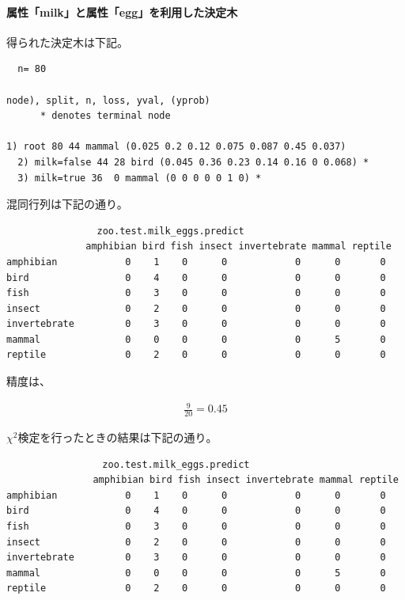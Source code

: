 \documentclass[dvipdfmx]{jsarticle}
\begin{document}
\paragraph{属性「milk」と属性「egg」を利用した決定木}\par
得られた決定木は下記。
\begin{verbatim}
  n= 80

node), split, n, loss, yval, (yprob)
      * denotes terminal node

1) root 80 44 mammal (0.025 0.2 0.12 0.075 0.087 0.45 0.037)
  2) milk=false 44 28 bird (0.045 0.36 0.23 0.14 0.16 0 0.068) *
  3) milk=true 36  0 mammal (0 0 0 0 0 1 0) *
\end{verbatim}
混同行列は下記の通り。
\begin{verbatim}
                zoo.test.milk_eggs.predict
              amphibian bird fish insect invertebrate mammal reptile
amphibian            0    1    0      0            0      0       0
bird                 0    4    0      0            0      0       0
fish                 0    3    0      0            0      0       0
insect               0    2    0      0            0      0       0
invertebrate         0    3    0      0            0      0       0
mammal               0    0    0      0            0      5       0
reptile              0    2    0      0            0      0       0
\end{verbatim}
精度は、
\begin{center}
  \begin{align*}
    \frac{9}{20} = 0.45
  \end{align*}
\end{center}
$χ^{2}検定を行ったときの結果は下記の通り。$
\begin{verbatim}
  　　　　　　　　　zoo.test.milk_eggs.predict
  　　　　　　　　amphibian bird fish insect invertebrate mammal reptile
amphibian            0    1    0      0            0      0       0
bird                 0    4    0      0            0      0       0
fish                 0    3    0      0            0      0       0
insect               0    2    0      0            0      0       0
invertebrate         0    3    0      0            0      0       0
mammal               0    0    0      0            0      5       0
reptile              0    2    0      0            0      0       0
\end{verbatim}
\end{document}
